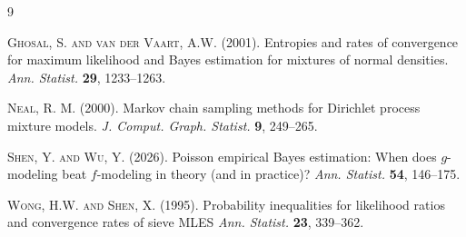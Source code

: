 \documentclass[twoside,12pt]{article}
\begin{document}
{}
\begin{thebibliography}{9}

\textsc{Ghosal, S. and van der Vaart, A.W.} (2001). Entropies and rates of convergence for maximum likelihood and Bayes estimation for mixtures of normal densities. \textit{Ann. Statist.} \textbf{29}, 1233--1263.

\textsc{Neal, R. M.} (2000). Markov chain sampling methods for Dirichlet process mixture models. \textit{J. Comput. Graph. Statist.} \textbf{9}, 249--265.

\textsc{Shen, Y. and Wu, Y.} (2026). Poisson empirical Bayes estimation: When does $g$-modeling beat $f$-modeling in theory (and in practice)? \textit{Ann. Statist.} \textbf{54}, 146--175.

\textsc{Wong, H.W. and Shen, X.} (1995). Probability inequalities for likelihood ratios and convergence rates of sieve MLES \textit{Ann. Statist.} \textbf{23}, 339--362.

\end{thebibliography}
\end{document}
